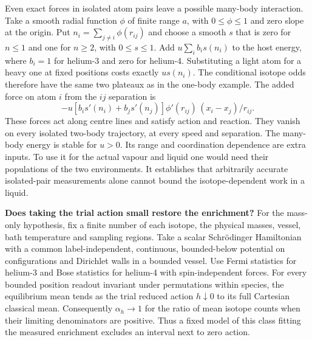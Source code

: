 \documentclass[11pt,a4paper]{article}
\begin{document}
Even exact forces in isolated atom pairs leave a possible many-body
interaction. Take a smooth radial function \(\phi\) of finite range
\(a\), with \(0\le\phi\le1\) and zero slope at the origin. Put
\(n_i=\sum_{j\ne i}\phi(r_{ij})\) and choose a smooth \(s\) that is zero
for \(n\le1\) and one for \(n\ge2\), with \(0\le s\le1\). Add
\(u\sum_i b_i s(n_i)\) to the host energy, where \(b_i=1\) for helium-3
and zero for helium-4. Substituting a light atom for a heavy one at
fixed positions costs exactly \(u s(n_i)\). The conditional isotope odds
therefore have the same two plateaux as in the one-body example. The
added force on atom \(i\) from the \(ij\) separation is \[
 -u[b_i s'(n_i)+b_j s'(n_j)]\phi'(r_{ij})\,
                   (x_i-x_j)/r_{ij}.
\] These forces act along centre lines and satisfy action and reaction.
They vanish on every isolated two-body trajectory, at every speed and
separation. The many-body energy is stable for \(u>0\). Its range and
coordination dependence are extra inputs. To use it for the actual
vapour and liquid one would need their populations of the two
environments. It establishes that arbitrarily accurate isolated-pair
measurements alone cannot bound the isotope-dependent work in a liquid.

\textbf{Does taking the trial action small restore the enrichment?} For
the mass-only hypothesis, fix a finite number of each isotope, the
physical masses, vessel, bath temperature and sampling regions. Take a
scalar Schrödinger Hamiltonian with a common label-independent,
continuous, bounded-below potential on configurations and Dirichlet
walls in a bounded vessel. Use Fermi statistics for helium-3 and Bose
statistics for helium-4 with spin-independent forces. For every bounded
position readout invariant under permutations within species, the
equilibrium mean tends as the trial reduced action \(h\downarrow0\) to
its full Cartesian classical mean. Consequently \(\alpha_h\to1\) for the
ratio of mean isotope counts when their limiting denominators are
positive. Thus a fixed model of this class fitting the measured
enrichment excludes an interval next to zero action.
\end{document}
